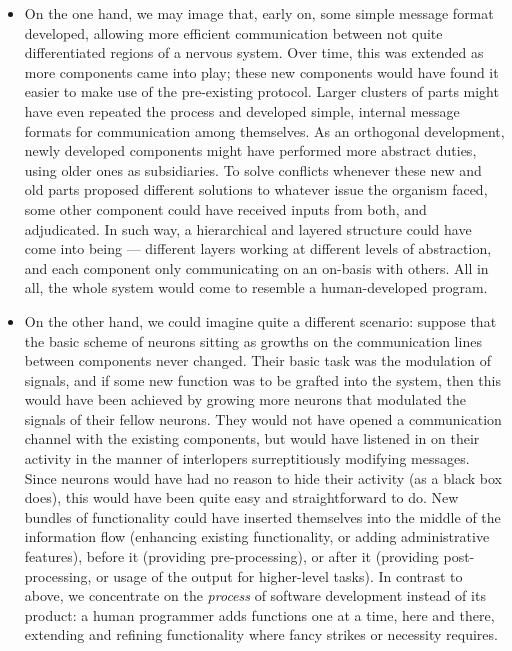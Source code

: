 \begin{itemize}
	\item On the one hand, we may image that, early on, some simple message format developed, allowing more efficient communication between not quite differentiated regions of a nervous system. Over time, this was extended as more components came into play; these new components would have found it easier to make use of the pre-existing protocol. Larger clusters of parts might have even repeated the process and developed simple, internal message formats for communication among themselves. As an orthogonal development, newly developed components might have performed more abstract duties, using older ones as subsidiaries. To solve conflicts whenever these new and old parts proposed different solutions to whatever issue the organism faced, some other component could have received inputs from both, and adjudicated. In such way, a hierarchical and layered structure could have come into being --- different layers working at different levels of abstraction, and each component only communicating on an on-basis with others. All in all, the whole system would come to resemble a human-developed program.
	
	\item On the other hand, we could imagine quite a different scenario: suppose that the basic scheme of neurons sitting as growths on the communication lines between components never changed. Their basic task was the modulation of signals, and if some new function was to be grafted into the system, then this would have been achieved by growing more neurons that modulated the signals of their fellow neurons. They would not have opened a communication channel with the existing components, but would have listened in on their activity in the manner of interlopers surreptitiously modifying messages. Since neurons would have had no reason to hide their activity (as a black box does), this would have been quite easy and straightforward to do. New bundles of functionality could have inserted themselves into the middle of the information flow (enhancing existing functionality, or adding administrative features), before it (providing pre-processing), or after it (providing post-processing, or usage of the output for higher-level tasks). In contrast to above, we concentrate on the {\em process} of software development instead of its product: a human programmer adds functions one at a time, here and there, extending and refining functionality where fancy strikes or necessity requires.
\end{itemize}

